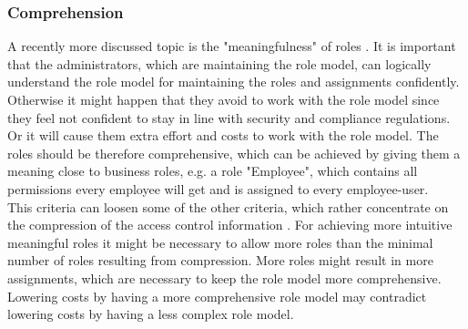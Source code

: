         \subsubsection{Comprehension}
        A recently more discussed topic is the "meaningfulness" of roles \cite{Xu}\cite{Frank}. It is important that the administrators, which are maintaining the role model, can logically understand the role model for maintaining the roles and assignments confidently. Otherwise it might happen that they avoid to work with the role model since they feel not confident to stay in line with security and compliance regulations. Or it will cause them extra effort and costs to work with the role model. The roles should be therefore comprehensive, which can be achieved by giving them a meaning close to business roles, e.g. a role "Employee", which contains all permissions every employee will get and is assigned to every employee-user.\\
        This criteria can loosen some of the other criteria, which rather concentrate on the compression of the access control information \cite{Frank2013}. For achieving more intuitive meaningful roles it might be necessary to allow more roles than the minimal number of roles resulting from compression. More roles might result in more assignments, which are necessary to keep the role model more comprehensive. Lowering costs by having a more comprehensive role model may contradict lowering costs by having a less complex role model.
        \iffalse
        In praxis the roles can be often bundled according to the user attributes Internal or External employee, Organizational Unit and Job Function. The pyramid in figure \ref{fig:rolePyramid} demonstrates how easily user-permission assignments can be covered by roles.
        \begin{figure}[H]
            \centering
            \texttt{[image: Role\_Pyramid]}
            \caption{Pyramid of general roles depending on user attributes. Most often roles can be described by the user attributes Internal or External employee, Organizational Unit and Job Function.}
            \label{fig:rolePyramid}
        \end{figure}
        \fi
    
